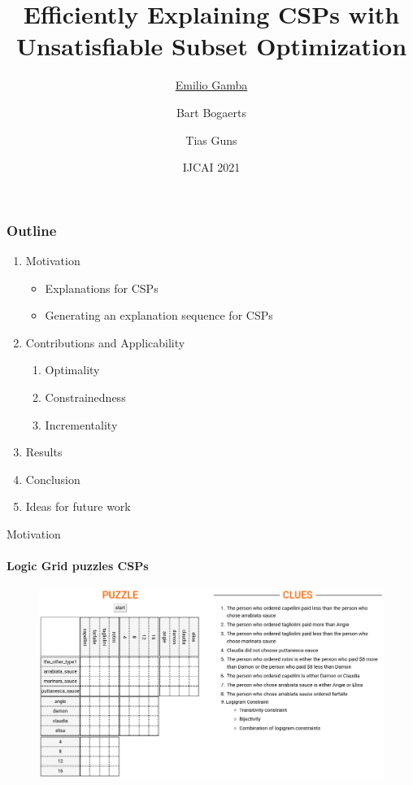 \documentclass{beamer}
\title{Efficiently Explaining CSPs with Unsatisfiable Subset Optimization}
\institute[shortinst]
{\inst{1} Vrije Universiteit Brussel, Belgium \\ %
\inst{2} KULeuven, Belgium \\ %
\href{mailto:emilio.gamba@vub.be}{\underline{emilio.gamba@vub.be}}, \href{mailto:bart.bogaerts@vub.be}{bart.bogaerts@vub.be}, \href{mailto:tias.guns@kuleuven.be}{tias.guns@kuleuven.be} %
}
\date{IJCAI 2021}
\author{\underline{Emilio Gamba}\inst{1} \and  Bart Bogaerts\inst{1} \and   Tias Guns\inst{1,2}}
\begin{document}
\begin{frame}
    \maketitle
    \vspace{-2.5cm}
\end{frame}


\begin{frame}
	\frametitle{Outline}
	\begin{enumerate}
		\item Motivation
		\begin{itemize}
			\item Explanations for CSPs
			\item Generating an explanation sequence for CSPs
		\end{itemize}
		\item Contributions and Applicability
		\begin{enumerate}
			\item Optimality
			\item Constrainedness
			\item Incrementality
		\end{enumerate}
	\item Results
	\item Conclusion
	
	\item Ideas for future work
	\end{enumerate}
\end{frame}

\begin{frame}{Motivation}
	\framesubtitle{Logic Grid puzzles CSPs}
	\begin{figure}
		\includegraphics[width=\textwidth]{logicpuzzles.png}
	\end{figure}
\end{frame}
\end{document}
